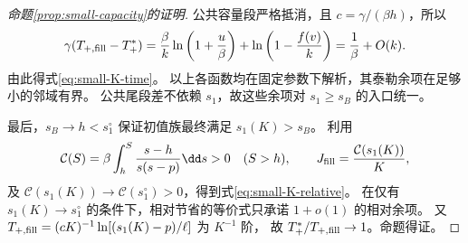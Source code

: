 \begin{proof}[命题\ref{prop:small-capacity}的证明]
公共容量段严格抵消，且 $c=\gamma/(\beta h)$，所以
\begin{equation}
 \gamma(T_{+,\rm fill}-T_+^*)
 =\frac\beta k\ln\left(1+\frac u\beta\right)
   +\ln\left(1-\frac{f(v)}k\right)
 =\frac1\beta+O(k).
 \label{eq:small-K-time-series}
\end{equation}
由此得式\eqref{eq:small-K-time}。
以上各函数均在固定参数下解析，其泰勒余项在足够小的邻域有界。
公共尾段差不依赖 $s_1$，故这些余项对 $s_1\ge s_B$ 的入口统一。

最后，$s_B\to h<s_1^\circ$ 保证初值族最终满足 $s_1(K)>s_B$。
利用
\[
 \mathcal C(S)=\beta\int_h^S\frac{s-h}{s(s-p)}\dd s>0\quad(S>h),
 \qquad J_{\rm fill}=\frac{\mathcal C(s_1(K))}K,
\]
及 $\mathcal C(s_1(K))\to\mathcal C(s_1^\circ)>0$，得到式\eqref{eq:small-K-relative}。
在仅有 $s_1(K)\to s_1^\circ$ 的条件下，相对节省的等价式只承诺 $1+o(1)$ 的相对余项。
又 $T_{+,\rm fill}=(cK)^{-1}\ln[(s_1(K)-p)/\ell]$ 为 $K^{-1}$ 阶，
故 $T_+^*/T_{+,\rm fill}\to1$。命题得证。
\end{proof}

